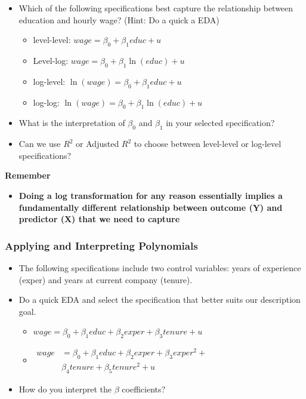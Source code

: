 \documentclass[
]{book}
\providecommand{\tightlist}{%
  \setlength{\itemsep}{0pt}\setlength{\parskip}{0pt}}
\theoremstyle{definition}
\theoremstyle{definition}
\theoremstyle{definition}
\theoremstyle{definition}
\theoremstyle{remark}
\begin{document}
\begin{itemize}
\item
  Which of the following specifications best capture the relationship between education and hourly wage? (Hint: Do a quick a EDA)

  \begin{itemize}
  \tightlist
  \item
    level-level: \(wage = \beta_0 + \beta_1 educ + u\)
  \item
    Level-log: \(wage = \beta_0 + \beta_1 \ln(educ)  + u\)
  \item
    log-level: \(\ln(wage) = \beta_0 + \beta_1 educ + u\)
  \item
    log-log: \(\ln(wage) = \beta_0 + \beta_1 \ln(educ) + u\)
  \end{itemize}
\item
  What is the interpretation of \(\beta_0\) and \(\beta_1\) in your selected specification?
\item
  Can we use \(R^2\) or Adjusted \(R^2\) to choose between level-level or log-level specifications?
\end{itemize}

\textbf{Remember}

\begin{itemize}
\tightlist
\item
  \textbf{Doing a log transformation for any reason essentially implies a fundamentally different relationship between outcome (Y) and predictor (X) that we need to capture}
\end{itemize}

\subsubsection{Applying and Interpreting Polynomials}\label{applying-and-interpreting-polynomials}

\begin{itemize}
\item
  The following specifications include two control variables: years of experience (exper) and years at current company (tenure).
\item
  Do a quick EDA and select the specification that better suits our description goal.

  \begin{itemize}
  \item
    \(wage = \beta_0 + \beta_1 educ + \beta_2 exper + \beta_3 tenure + u\)
  \item
    \(\begin{aligned}
    wage &= \beta_0 + \beta_1 educ + \beta_2 exper + \beta_3 exper^2 + \\
    & \beta_4 tenure + \beta_5 tenure^2 + u
    \end{aligned}\)
  \end{itemize}
\item
  How do you interpret the \(\beta\) coefficients?
\end{itemize}
\end{document}
